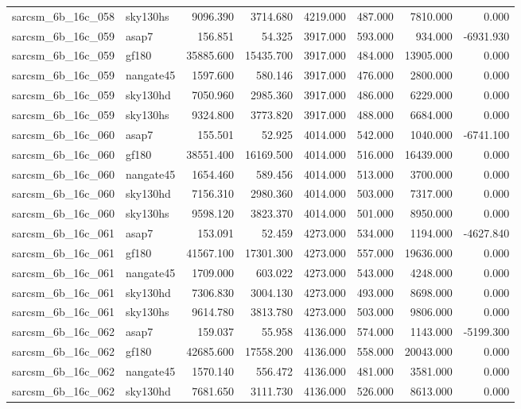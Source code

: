 \begin{tabular}{llrrrrrr}
sarcsm\_6b\_16c\_058 & sky130hs & 9096.390 & 3714.680 & 4219.000 & 487.000 & 7810.000 & 0.000 \\
sarcsm\_6b\_16c\_059 & asap7 & 156.851 & 54.325 & 3917.000 & 593.000 & 934.000 & -6931.930 \\
sarcsm\_6b\_16c\_059 & gf180 & 35885.600 & 15435.700 & 3917.000 & 484.000 & 13905.000 & 0.000 \\
sarcsm\_6b\_16c\_059 & nangate45 & 1597.600 & 580.146 & 3917.000 & 476.000 & 2800.000 & 0.000 \\
sarcsm\_6b\_16c\_059 & sky130hd & 7050.960 & 2985.360 & 3917.000 & 486.000 & 6229.000 & 0.000 \\
sarcsm\_6b\_16c\_059 & sky130hs & 9324.800 & 3773.820 & 3917.000 & 488.000 & 6684.000 & 0.000 \\
sarcsm\_6b\_16c\_060 & asap7 & 155.501 & 52.925 & 4014.000 & 542.000 & 1040.000 & -6741.100 \\
sarcsm\_6b\_16c\_060 & gf180 & 38551.400 & 16169.500 & 4014.000 & 516.000 & 16439.000 & 0.000 \\
sarcsm\_6b\_16c\_060 & nangate45 & 1654.460 & 589.456 & 4014.000 & 513.000 & 3700.000 & 0.000 \\
sarcsm\_6b\_16c\_060 & sky130hd & 7156.310 & 2980.360 & 4014.000 & 503.000 & 7317.000 & 0.000 \\
sarcsm\_6b\_16c\_060 & sky130hs & 9598.120 & 3823.370 & 4014.000 & 501.000 & 8950.000 & 0.000 \\
sarcsm\_6b\_16c\_061 & asap7 & 153.091 & 52.459 & 4273.000 & 534.000 & 1194.000 & -4627.840 \\
sarcsm\_6b\_16c\_061 & gf180 & 41567.100 & 17301.300 & 4273.000 & 557.000 & 19636.000 & 0.000 \\
sarcsm\_6b\_16c\_061 & nangate45 & 1709.000 & 603.022 & 4273.000 & 543.000 & 4248.000 & 0.000 \\
sarcsm\_6b\_16c\_061 & sky130hd & 7306.830 & 3004.130 & 4273.000 & 493.000 & 8698.000 & 0.000 \\
sarcsm\_6b\_16c\_061 & sky130hs & 9614.780 & 3813.780 & 4273.000 & 503.000 & 9806.000 & 0.000 \\
sarcsm\_6b\_16c\_062 & asap7 & 159.037 & 55.958 & 4136.000 & 574.000 & 1143.000 & -5199.300 \\
sarcsm\_6b\_16c\_062 & gf180 & 42685.600 & 17558.200 & 4136.000 & 558.000 & 20043.000 & 0.000 \\
sarcsm\_6b\_16c\_062 & nangate45 & 1570.140 & 556.472 & 4136.000 & 481.000 & 3581.000 & 0.000 \\
sarcsm\_6b\_16c\_062 & sky130hd & 7681.650 & 3111.730 & 4136.000 & 526.000 & 8613.000 & 0.000 \\

\end{tabular}
